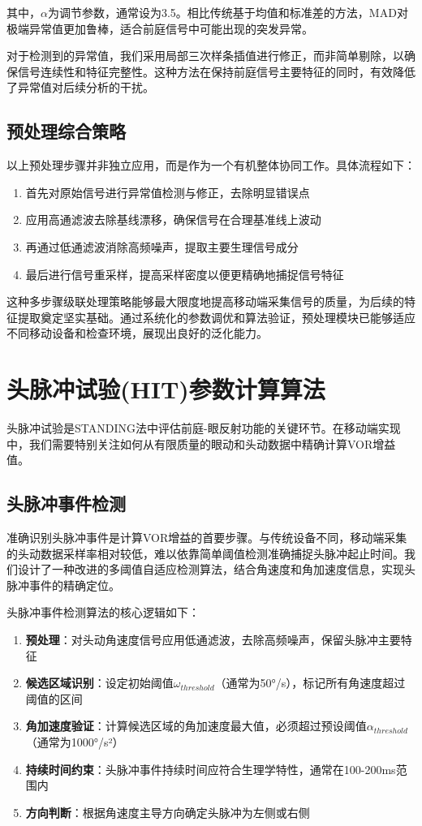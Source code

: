 其中，$\alpha$为调节参数，通常设为3.5。相比传统基于均值和标准差的方法，MAD对极端异常值更加鲁棒，适合前庭信号中可能出现的突发异常。

对于检测到的异常值，我们采用局部三次样条插值进行修正，而非简单剔除，以确保信号连续性和特征完整性。这种方法在保持前庭信号主要特征的同时，有效降低了异常值对后续分析的干扰。

\subsection{预处理综合策略}

以上预处理步骤并非独立应用，而是作为一个有机整体协同工作。具体流程如下：

\begin{enumerate}
  \item 首先对原始信号进行异常值检测与修正，去除明显错误点
  \item 应用高通滤波去除基线漂移，确保信号在合理基准线上波动
  \item 再通过低通滤波消除高频噪声，提取主要生理信号成分
  \item 最后进行信号重采样，提高采样密度以便更精确地捕捉信号特征
\end{enumerate}

这种多步骤级联处理策略能够最大限度地提高移动端采集信号的质量，为后续的特征提取奠定坚实基础。通过系统化的参数调优和算法验证，预处理模块已能够适应不同移动设备和检查环境，展现出良好的泛化能力。

\section{头脉冲试验(HIT)参数计算算法}

头脉冲试验是STANDING法中评估前庭-眼反射功能的关键环节。在移动端实现中，我们需要特别关注如何从有限质量的眼动和头动数据中精确计算VOR增益值。

\subsection{头脉冲事件检测}

准确识别头脉冲事件是计算VOR增益的首要步骤。与传统设备不同，移动端采集的头动数据采样率相对较低，难以依靠简单阈值检测准确捕捉头脉冲起止时间。我们设计了一种改进的多阈值自适应检测算法，结合角速度和角加速度信息，实现头脉冲事件的精确定位。

头脉冲事件检测算法的核心逻辑如下：

\begin{enumerate}
  \item \textbf{预处理}：对头动角速度信号应用低通滤波，去除高频噪声，保留头脉冲主要特征
  \item \textbf{候选区域识别}：设定初始阈值$\omega_{threshold}$（通常为50°/s），标记所有角速度超过阈值的区间
  \item \textbf{角加速度验证}：计算候选区域的角加速度最大值，必须超过预设阈值$\alpha_{threshold}$（通常为1000°/s²）
  \item \textbf{持续时间约束}：头脉冲事件持续时间应符合生理学特性，通常在100-200ms范围内
  \item \textbf{方向判断}：根据角速度主导方向确定头脉冲为左侧或右侧
\end{enumerate}

